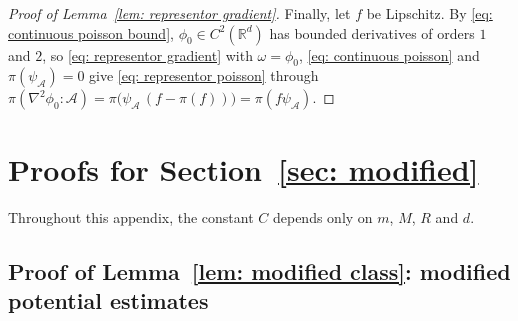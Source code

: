 \begin{proof}[Proof of Lemma~\ref{lem: representor gradient}]
    Finally, let $f$ be Lipschitz. By \eqref{eq: continuous poisson bound}, $\phi_0 \in C^2(\mathbb R^d)$ has bounded derivatives of orders $1$ and $2$, so \eqref{eq: representor gradient} with $\omega = \phi_0$, \eqref{eq: continuous poisson} and $\pi(\psi_{\mathcal A}) = 0$ give \eqref{eq: representor poisson} through $\pi(\nabla^2 \phi_0 : \mathcal A) = \pi\bigl( \psi_{\mathcal A}\, ( f - \pi(f) ) \bigr) = \pi(f \psi_{\mathcal A})$.
\end{proof}

\section{Proofs for Section~\ref{sec: modified}}
\label{app: modified}

Throughout this appendix, the constant $C$ depends only on $m$, $M$, $R$ and $d$.

\subsection{Proof of Lemma~\ref{lem: modified class}: modified potential estimates}
\label{sec: modified class proof}

